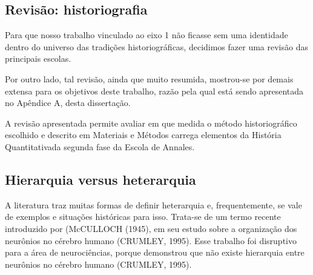 \documentclass[
12pt,		%
openright,	%
twoside,  %
a4paper,			%
chapter=TITLE,		%
english,			%
french,				%
spanish,			%
brazil				%
]{USPSC-classe/USPSC}
\begin{document}
\subsection[Revis\~ao: historiografia]{Revis\~ao: historiografia}\label{Revis\~ao: historiografia}
Para que nosso trabalho vinculado ao eixo 1 n\~ao ficasse sem uma identidade dentro do universo das tradi\c{c}\~oes historiogr\'aficas, decidimos fazer uma revis\~ao das principais escolas.

















Por outro lado, tal revis\~ao, ainda que muito resumida, mostrou-se por demais extensa para os objetivos deste trabalho, raz\~ao pela qual est\'a sendo apresentada no Ap\^endice A, desta disserta\c{c}\~ao.

















A revis\~ao apresentada permite avaliar em que medida o m\'etodo historiogr\'afico escolhido e descrito em Materiais e M\'etodos carrega elementos da \textquotedbl Hist\'oria Quantitativa\textquotedbl  da segunda fase da Escola de Annales.

















\subsection[Hierarquia versus heterarquia]{Hierarquia versus heterarquia}\label{Hierarquia versus heterarquia}
A literatura traz muitas formas de definir heterarquia e, frequentemente, se vale de exemplos e situa\c{c}\~oes hist\'oricas para isso. Trata-se de um termo  recente introduzido  por (McCULLOCH (1945), em seu estudo sobre a organiza\c{c}\~ao dos neur\^onios no c\'erebro humano (CRUMLEY, 1995). Esse trabalho foi disruptivo para a \'area de neuroci\^encias, porque demonstrou que n\~ao existe hierarquia entre neur\^onios no c\'erebro humano  (CRUMLEY, 1995).
\end{document}
